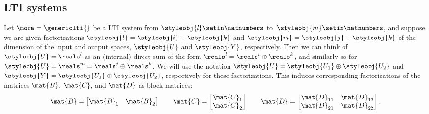 \subsection{LTI systems}

Let $\mora = \genericlti{}$ be a LTI system from $\styleobj{l}\setin \natnumbers$ to~$\styleobj{m}\setin \natnumbers$, and suppose we are given factorizations $\styleobj{l} = \styleobj{i} + \styleobj{k}$ and $\styleobj{m} = \styleobj{j} + \styleobj{k}$ of the dimension of the input and output spaces, $\styleobj{U}$ and $\styleobj{Y}$, respectively.
Then we can think of $\styleobj{U} = \reals^l$ as an (internal) direct sum of the form $\reals^l = \reals^i \oplus \reals^k$, and similarly so for $\styleobj{U} = \reals^m = \reals^j \oplus \reals^k$.
We will use the notation $\styleobj{U} = \styleobj{U_1} \oplus \styleobj{U_2}$ and $\styleobj{Y} = \styleobj{U_1} \oplus \styleobj{U_2}$, respectively for these factorizations.
This induces corresponding factorizations of the matrices $\mat{B}$, $\mat{C}$, and $\mat{D}$ as block matrices:
\begin{equation}
    \mat{B} =
    \begin{bmatrix}
        \mat{B}_1 & \mat{B}_2
    \end{bmatrix}
    \qquad
    \mat{C} =
    \begin{bmatrix}
        \mat{C}_1 \\
        \mat{C}_2
    \end{bmatrix}
    \qquad
    \mat{D} =
    \begin{bmatrix}
        \mat{D}_{11} & \mat{D}_{12} \\
        \mat{D}_{21} & \mat{D}_{22}
    \end{bmatrix}.
\end{equation}

